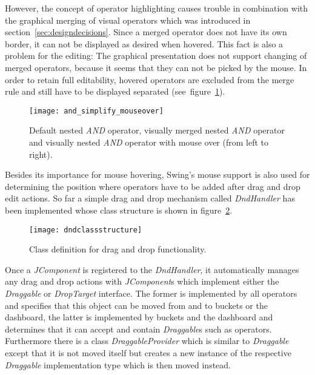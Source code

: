 
However, the concept of operator highlighting causes trouble in combination with the graphical merging of visual operators which was introduced in section~\ref{sec:designdecisions}. Since a merged operator does not have its own border, it can not be displayed as desired when hovered. This fact is also a problem for the editing: The graphical presentation does not support changing of merged operators, because it seems that they can not be picked by the mouse.
In order to retain full editability, hovered operators are excluded from the merge rule and still have to be displayed separated (see~figure~\ref{fig:nested_and_mouseover}).
\begin{figure}[htbp]
  \centering
  \texttt{[image: and\_simplify\_mouseover]}
  \caption{Default nested \emph{AND} operator, visually merged nested \emph{AND} operator and visually nested \emph{AND} operator with mouse over (from left to right).
  }
  \label{fig:nested_and_mouseover}
\end{figure}


Besides its importance for mouse hovering, Swing's mouse support is also used for determining the position where operators have to be added after drag and drop edit actions. So far
a simple drag and drop mechanism called \emph{DndHandler} has been implemented whose class structure is shown in figure~\ref{fig:dndclassstructure}.
\begin{figure}[htbp]
  \centering
  \texttt{[image: dndclassstructure]} 
  \caption{Class definition for drag and drop functionality.}
  \label{fig:dndclassstructure}
\end{figure}%
Once a \emph{JComponent} is registered to the \emph{DndHandler}, it automatically manages any drag and drop actions with \emph{JComponent}s which implement either the \emph{Draggable} or \emph{DropTarget} interface. The former is implemented by all operators and specifies that this object can be moved from and to buckets or the dashboard, the latter is implemented by buckets and the dashboard and determines that it can accept and contain \emph{Draggable}s such as operators.
Furthermore there is a class \emph{DraggableProvider} which is similar to \emph{Draggable} except that it is not moved itself but creates a new instance of the respective \emph{Draggable} implementation type which is then moved instead.

